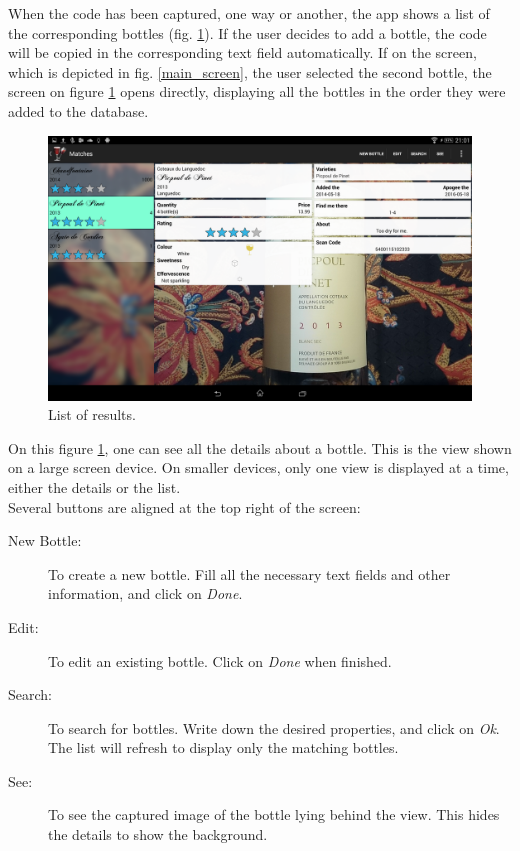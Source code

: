 When the code has been captured, one way or another, the app shows a list of the corresponding bottles (fig. \ref{list_results}). If the user decides to add a bottle, the code will be copied in the corresponding text field automatically. If on the screen, which is depicted in fig. \ref{main_screen}, the user selected the second bottle, the screen on figure \ref{list_results} opens directly, displaying all the bottles in the order they were added to the database.

\begin{figure}[H]
\begin{center}
	\includegraphics[width=\textwidth]{Images/ResultsActivity.png}
	\caption{List of results.}
	\label{list_results}
\end{center}
\end{figure}

On this figure \ref{list_results}, one can see all the details about a bottle. This is the view shown on a large screen device. On smaller devices, only one view is displayed at a time, either the details or the list.\\

Several buttons are aligned at the top right of the screen:
\begin{description}
\item[New Bottle:] To create a new bottle. Fill all the necessary text fields and other information, and click on \emph{Done}.
\item[Edit:] To edit an existing bottle. Click on \emph{Done} when finished.
\item[Search:] To search for bottles. Write down the desired properties, and click on \emph{Ok}. The list will refresh to display only the matching bottles.
\item[See:] To see the captured image of the bottle lying behind the view. This hides the details to show the background.
\end{description}

